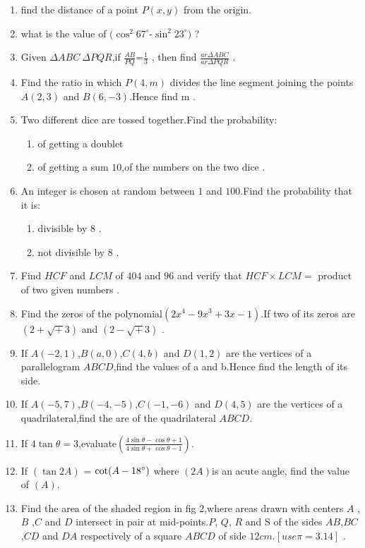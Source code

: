 \documentclass{article}
\begin{document}
\begin{enumerate}
\item find the distance of a point $P(x,y)$ from the origin.
\item what is the value of $(\cos^2{67^\circ}$-$\sin^2{23^\circ})$ ?
\item Given $\Delta ABC ~ \Delta PQR$,if $\frac{AB}{PQ}$=$\frac{1}{3}$ , then find $\frac {ar \Delta ABC}{ar \Delta PQR}$ .
\item Find the ratio in which $P(4,m)$ divides the line segment joining the points $A(2,3)$ and $B(6,-3)$.Hence find m .
\item Two different dice are tossed together.Find the probability:
	\begin{enumerate}[label=\roman*)]
		\item of getting a doublet
		\item of getting a sum $10$,of the numbers on the two dice .
	\end{enumerate}
\item An integer is chosen at random between $1$ and $100$.Find the probability that it is:
	\begin{enumerate}[label=\roman*)]
		\item divisible by $8$ .
		\item not divisible by $8$ .
	\end{enumerate}
\item Find $HCF$ and $LCM$ of $404$ and $96$ and verify that $HCF \times LCM =$ product of two given numbers .
\item Find the zeros of the polynomial$(2x^4-9x^3+3x-1)$.If two of its zeros are $(2+\sqrt+3)$ and $(2-\sqrt+3)$ .
\item If $ A(-2,1)$,$ B(a,0)$,$ C(4,b)$ and $ D(1,2)$ are the vertices of a parallelogram $ABCD$,find the values of a and b.Hence find the length of its side.
\item If $  A(-5,7)$,$ B(-4,-5)$,$ C(-1,-6)$ and $ D(4,5)$ are the vertices of a quadrilateral,find the are of the quadrilateral $ABCD$.
\item If $4\tan\theta=3$,evaluate$(\frac {4\sin\theta-\cos\theta+1} {4\sin\theta+\cos\theta-1})$.
\item If $( \tan 2A)$ = $\cot(A - 18\degree)$  where $(2A)$is an acute angle, find the value of $(A)$.
\item Find the area of the shaded region in fig 2,where areas drawn with centers $A$ ,$B$ ,$C$ and $D$ intersect in pair at mid-points.$P$, $Q$, $R$ and S of the sides $AB$,$BC$,$CD$ and $DA$ respectively of a square $ABCD$ of side $12cm$.$[use \pi=3.14]$ .

\end{enumerate}
\end{document}
